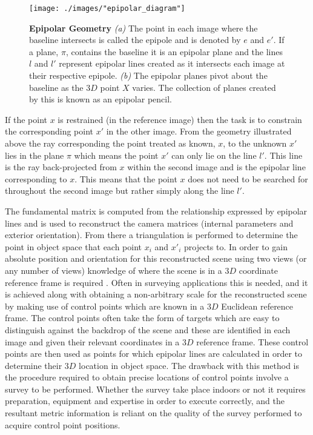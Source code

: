 \begin{figure}[ht!]
	\centering
	\texttt{[image: ./images/"epipolar\_diagram"]}
	\caption{\textbf{Epipolar Geometry} \textit{(a)} The point in each image where the baseline intersects is called the epipole and is denoted by $e$ and $e'$. If a plane, $\pi$, contains the baseline it is an epipolar plane and the lines $l$ and $l'$ represent epipolar lines created as it intersects each image at their respective epipole. \textit{(b)} The epipolar planes pivot about the baseline as the $3D$ point $X$ varies. The collection of planes created by this is known as an epipolar pencil. \citep{hartley_multiple_2003}
		\label{epipolar}}
\end{figure}

If the point $x$ is restrained (in the reference image) then the task is to constrain the corresponding point $x'$ in the other image. From the geometry illustrated above the ray corresponding the point treated as known, $x$, to the unknown $x'$ lies in the plane $\pi$ which means the point $x'$ can only lie on the line $l'$. This line is the ray back-projected from $x$ within the second image and is the epipolar line corresponding to $x$. This means that the point $x$ does not need to be searched for throughout the second image but rather simply along the line $l'$. 

The fundamental matrix is computed from the relationship expressed by epipolar lines and is used to reconstruct the camera matrices (internal parameters and exterior orientation). From there a triangulation is performed to determine the point in object space that each point $x_i$ and $x'_i$ projects to. In order to gain absolute position and orientation for this reconstructed scene using two views (or any number of views) knowledge of where the scene is in a $3D$ coordinate reference frame is required \citep{hartley_multiple_2003}. Often in surveying applications this is needed, and it is achieved along with obtaining a non-arbitrary scale for the reconstructed scene by making use of control points which are known in a $3D$ Euclidean reference frame. The control points often take the form of targets which are easy to distinguish against the backdrop of the scene and these are identified in each image and given their relevant coordinates in a $3D$ reference frame. These control points are then used as points for which epipolar lines are calculated in order to determine their $3D$ location in object space. The drawback with this method is the procedure required to obtain precise locations of control points involve a survey to be performed. Whether the survey take place indoors or not it requires preparation, equipment and expertise in order to execute correctly, and the resultant metric information is reliant on the quality of the survey performed to acquire control point positions.


